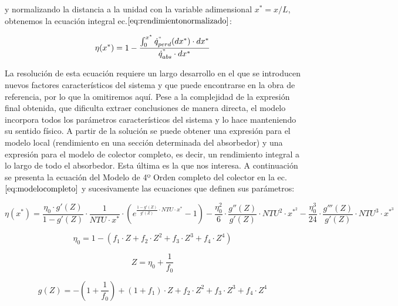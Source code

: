 \documentclass[11pt]{article}
\begin{document}
y normalizando la distancia a la unidad con la variable adimensional
\(x^{*}=x/L\), obtenemos la ecuación integral
ec.\(\eqref{eq:rendimientonormalizado}\):

\begin{equation}
    \eta(x^{*}) = 1 - \frac{\int_{0}^{x^{*}} \dot{q}^{"}_{perd}(dx^{*})\cdot dx^{*}}{\dot{q}^{"}_{abs}\cdot dx^{*}} \label{eq:rendimientonormalizado}
\end{equation}

La resolución de esta ecuación requiere un largo desarrollo en el que se
introducen nuevos factores característicos del sistema y que puede
encontrarse en la obra de referencia, por lo que la omitiremos aquí.
Pese a la complejidad de la expresión final obtenida, que dificulta
extraer conclusiones de manera directa, el modelo incorpora todos los
parámetros característicos del sistema y lo hace manteniendo su sentido
físico. A partir de la solución se puede obtener una expresión para el
modelo local (rendimiento en una sección determinada del absorbedor) y
una expresión para el modelo de colector completo, es decir, un
rendimiento integral a lo largo de todo el absorbedor. Esta última es la
que nos interesa. A continuación se presenta la ecuación del Modelo de
4º Orden completo del colector en la ec.\(\eqref{eq:modelocompleto}\) y
sucesivamente las ecuaciones que definen sus parámetros:

\begin{equation}
    \eta(x^{*}) = \frac{\eta_{0} \cdot g'(Z)}{1-g'(Z)} \cdot \frac{1}{NTU \cdot x^{*}} \cdot \left(e^{\frac{1-g'(Z)}{g'(Z)}\cdot NTU \cdot x^{*}} - 1\right) - \frac{\eta_{0}^2}{6} \cdot \frac{g''(Z)}{g'(Z)} \cdot NTU^{2} \cdot x^{*^{2}} - \frac{\eta_{0}^{3}}{24} \cdot \frac{g'''(Z)}{g'(Z)} \cdot NTU^{3} \cdot x^{*^{3}}
    \label{eq:modelocompleto}
\end{equation}

\begin{equation}
    \eta_{0} = 1 - (f_{1} \cdot Z + f_{2} \cdot Z^{2} + f_{3} \cdot Z^{3} + f_{4} \cdot Z^{4})
    \label{eq:rendimiento0}
\end{equation}

\begin{equation}
    Z = \eta_{0} + \frac{1}{f_{0}} 
    \label{eq:zeta}
\end{equation}

\begin{equation}
    g(Z) = -\left(1+\frac{1}{f_{0}}\right)+(1+f_{1})\cdot Z + f_{2}\cdot Z^{2} +  f_{3}\cdot Z^{3} + f_{4}\cdot Z^{4} 
    \label{eq:gdezeta}
\end{equation}
\end{document}
